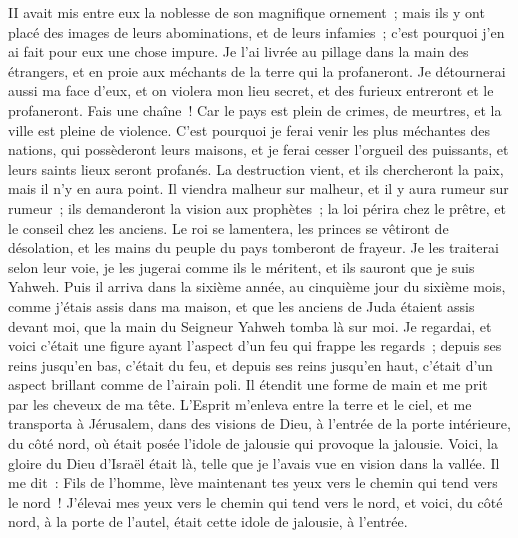 \begin{multicols}{2}
II avait mis entre eux la noblesse de son magnifique ornement~; mais ils y ont placé des images de leurs abominations, et de leurs infamies~; c'est pourquoi j'en ai fait pour eux une chose impure.
Je l'ai livrée au pillage dans la main des étrangers, et en proie aux méchants de la terre qui la profaneront.
Je détournerai aussi ma face d'eux, et on violera mon lieu secret, et des furieux entreront et le profaneront.
Fais une chaîne~! Car le pays est plein de crimes, de meurtres, et la ville est pleine de violence.
C'est pourquoi je ferai venir les plus méchantes des nations, qui possèderont leurs maisons, et je ferai cesser l'orgueil des puissants, et leurs saints lieux seront profanés.
La destruction vient, et ils chercheront la paix, mais il n'y en aura point.
Il viendra malheur sur malheur, et il y aura rumeur sur rumeur~; ils demanderont la vision aux prophètes~; la loi périra chez le prêtre, et le conseil chez les anciens.
Le roi se lamentera, les princes se vêtiront de désolation, et les mains du peuple du pays tomberont de frayeur. Je les traiterai selon leur voie, je les jugerai comme ils le méritent, et ils sauront que je suis Yahweh.
\VerseOne{}Puis il arriva dans la sixième année, au cinquième jour du sixième mois, comme j'étais assis dans ma maison, et que les anciens de Juda étaient assis devant moi, que la main du Seigneur Yahweh tomba là sur moi.
Je regardai, et voici c'était une figure ayant l'aspect d'un feu qui frappe les regards~; depuis ses reins jusqu'en bas, c'était du feu, et depuis ses reins jusqu'en haut, c'était d'un aspect brillant comme de l'airain poli.
Il étendit une forme de main et me prit par les cheveux de ma tête. L'Esprit m'enleva entre la terre et le ciel, et me transporta à Jérusalem, dans des visions de Dieu, à l'entrée de la porte intérieure, du côté nord, où était posée l'idole de jalousie qui provoque la jalousie.
Voici, la gloire du Dieu d'Israël était là, telle que je l'avais vue en vision dans la vallée.
Il me dit~: Fils de l'homme, lève maintenant tes yeux vers le chemin qui tend vers le nord~! J'élevai mes yeux vers le chemin qui tend vers le nord, et voici, du côté nord, à la porte de l'autel, était cette idole de jalousie, à l'entrée.

\end{multicols}
